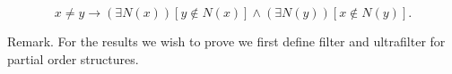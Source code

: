$$x \neq y \rightarrow (\exists N(x))[y \notin N(x)] \wedge (\exists N(y))[x \notin N(y)].$$

Remark. For the results we wish to prove we first define filter and ultrafilter for partial order structures.
